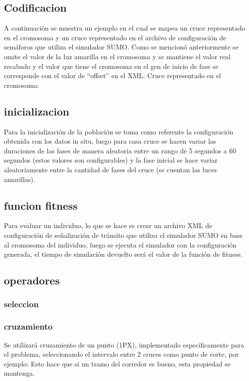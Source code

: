 \subsection{Codificacion} 
A continuación se muestra un ejemplo en el cual se mapea un
cruce representado en el cromosoma y un cruce representado
en  el  archivo  de  configuración  de  semáforos  que  utiliza  el
simulador SUMO.
Como se  mencionó anteriormente se omite el valor de la luz
amarilla en el cromosoma y se mantiene el valor real recabado
y el valor que tiene el cromosoma en el gen de inicio de fase
se corresponde con el valor de “offset” en el XML.
Cruce representado en el cromosoma:
\subsection{inicializacion}
Para la inicialización de la población se toma como referente
la configuración obtenida con los datos in situ, luego para casa
cruce  se  hacen  variar  las  duraciones  de  las  fases  de  manera
aleatoria  entre  un  rango  de  5  segundos  a  60  segundos  (estos
valores  son  configurables)  y  la  fase  inicial  se  hace  variar
aleatoriamente entre la cantidad de fases del cruce  (se cuentan
las luces amarillas).
\subsection{funcion fitness}
Para evaluar un individuo, lo que se hace es crear un archivo
XML  de configuración de señalización de tránsito que utiliza
el  simulador  SUMO  en  base  al  cromosoma  del  individuo,
luego se ejecuta el simulador con la configuración generada, el
tiempo de simulación devuelto será el valor de la función de
fitness.

\subsection{operadores}
\subsubsection{seleccion}
\subsubsection{cruzamiento}
Se  utilizará  cruzamiento  de  un  punto  (1PX),  implementado
específicamente  para  el  problema,  seleccionando  el  intervalo
entre 2 cruces como punto de corte, por ejemplo:
Esto  hace  que  si  un  tramo  del  corredor  es  bueno,  esta
propiedad se mantenga.
